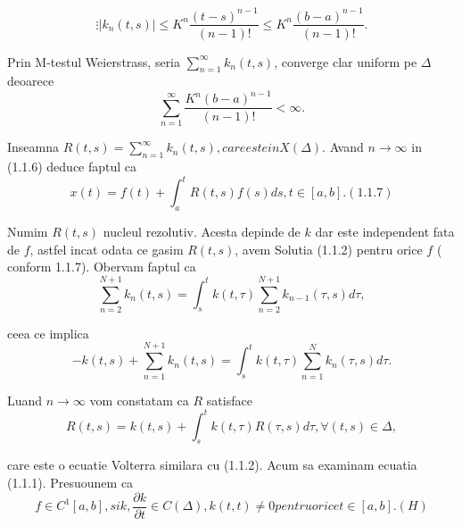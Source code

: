 \documentclass[a4paper,12pt,oneside]{report}
\begin{document}
\begin{displaymath}
  \vdots
\left | k_{n}\left ( t,s \right ) \right |\leq K^{n}\frac{\left ( t-s \right )^{n-1}}{\left ( n-1 \right )!}\leq K^{n}\frac{\left ( b-a \right )^{n-1}}{\left ( n-1 \right )!}. 
\end{displaymath}

	Prin M-testul Weierstrass, seria \(\sum_{n=1}^{\infty }k_{n}\left ( t,s \right )\), converge clar uniform pe \(\Delta\) deoarece 
\begin{displaymath}
  \sum_{n=1}^{\infty }\frac{K^{n}\left ( b-a \right )^{n-1}}{\left ( n-1 \right )!}< \infty.
\end{displaymath}

	Inseamna 
\(R\left ( t,s \right ) = \sum_{n=1}^{\infty }k_{n}\left ( t,s \right ), 
care este in X\left ( \Delta  \right ).\) Avand \(n\rightarrow \infty\) in (1.1.6) deduce faptul ca 
\begin{displaymath}
  x\left ( t \right ) = f\left ( t \right ) + \int_{a}^{t}R\left ( t,s \right )f\left ( s \right )ds, t\in \left [ a,b \right ]. (1.1.7)
\end{displaymath}

	Numim \(R\left ( t,s \right )\) nucleul rezolutiv. Acesta depinde de \(k\) dar este independent fata de \(f\), astfel incat odata ce gasim \(R\left ( t,s \right )\), avem Solutia (1.1.2) pentru orice \(f\) ( conform 1.1.7). 
	Obervam faptul ca 
\begin{displaymath}
  \sum_{n=2}^{N+1}k_{n}\left ( t,s \right ) = \int_{s}^{t}k\left ( t,\tau  \right )\sum_{n=2}^{N+1}k_{n-1}\left ( \tau ,s \right )d\tau,
\end{displaymath}

ceea ce implica 
\begin{displaymath}
  -k\left ( t,s \right ) + \sum_{n=1}^{N+1}k_{n}\left ( t,s \right ) = \int_{s}^{t}k\left ( t,\tau  \right )\sum_{n=1}^{N}k_{n}\left ( \tau ,s \right )d\tau .
\end{displaymath}

	Luand \(n\rightarrow \infty\) vom constatam ca \(R\) satisface 
\begin{displaymath}
  R\left ( t,s \right ) = k\left ( t,s \right ) + \int_{s}^{t}k\left ( t,\tau  \right )R\left ( \tau ,s \right )d\tau , \forall \left ( t,s \right )\in \Delta , 
\end{displaymath}

care este o ecuatie Volterra similara cu (1.1.2). 
	Acum sa examinam ecuatia (1.1.1). Presuounem ca 
\begin{displaymath}
  f\in C^{1}\left [ a,b \right ], si k, \frac{\partial k}{\partial t}\in C\left ( \Delta  \right ), k\left ( t,t \right )\neq 0 pentru orice t \in \left [ a,b \right ]. (H)
\end{displaymath}
\end{document}
